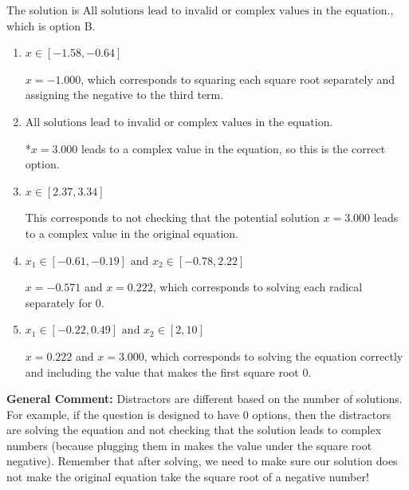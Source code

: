 \documentclass{extbook}[14pt]
\begin{document}
\begin{enumerate}
{The solution is \( \text{All solutions lead to invalid or complex values in the equation.} \), which is option B.\begin{enumerate}[label=\Alph*.]
\item \( x \in [-1.58,-0.64] \)

$x = -1.000$, which corresponds to squaring each square root separately and assigning the negative to the third term.
\item \( \text{All solutions lead to invalid or complex values in the equation.} \)

*$x = 3.000$ leads to a complex value in the equation, so this is the correct option.
\item \( x \in [2.37,3.34] \)

This corresponds to not checking that the potential solution $x = 3.000$ leads to a complex value in the original equation.
\item \( x_1 \in [-0.61, -0.19] \text{ and } x_2 \in [-0.78,2.22] \)

$x = -0.571$ and $x = 0.222$, which corresponds to solving each radical separately for 0.
\item \( x_1 \in [-0.22, 0.49] \text{ and } x_2 \in [2,10] \)

$x = 0.222$ and $x = 3.000$, which corresponds to solving the equation correctly and including the value that makes the first square root 0.
\end{enumerate}

\textbf{General Comment:} Distractors are different based on the number of solutions. For example, if the question is designed to have 0 options, then the distractors are solving the equation and not checking that the solution leads to complex numbers (because plugging them in makes the value under the square root negative). Remember that after solving, we need to make sure our solution does not make the original equation take the square root of a negative number!
}
\end{enumerate}
\end{document}
